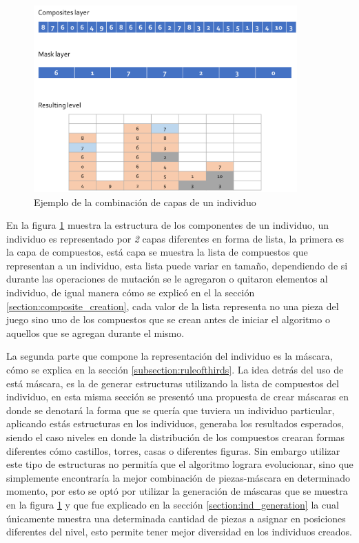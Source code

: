\begin{figure}
  \centering
  \includegraphics[width=0.9\textwidth]{img/layer12_combine.png}
  \caption{Ejemplo de la combinación de capas de un individuo}
  \label{figure:individual_representation}
\end{figure}

En la figura \ref{figure:individual_representation} muestra la estructura de los
componentes de un individuo, un individuo es representado por \textit{2} capas
diferentes en forma de lista, la primera es la capa de compuestos, está capa se
muestra la lista de compuestos que representan a un individuo, esta lista puede
variar en tamaño, dependiendo de si durante las operaciones de mutación se le
agregaron o quitaron elementos al individuo, de igual manera cómo se explicó en
el la sección \ref{section:composite_creation}, cada valor de la lista representa
no una pieza del juego sino uno de los compuestos que se crean antes de iniciar
el algoritmo o aquellos que se agregan durante el mismo.

La segunda parte que compone la representación del individuo es la máscara, cómo
se explica en la sección \ref{subsection:ruleofthirds}. La idea detrás del uso de
está máscara, es la de generar estructuras utilizando la lista de compuestos del
individuo, en esta misma sección se presentó una propuesta de crear máscaras en
donde se denotará la forma que se quería que tuviera un individuo particular,
aplicando estás estructuras en los individuos, generaba los resultados esperados,
siendo el caso niveles en donde la distribución de los compuestos crearan formas
diferentes cómo castillos, torres, casas o diferentes figuras. Sin embargo
utilizar este tipo de estructuras no permitía que el algoritmo lograra
evolucionar, sino que simplemente encontraría la mejor combinación de
piezas-máscara en determinado momento, por esto se optó por utilizar la
generación de máscaras que se muestra en la figura
\ref{figure:individual_representation} y que fue explicado en la sección
\ref{section:ind_generation} la cual únicamente muestra una determinada cantidad
de piezas a asignar en posiciones diferentes del nivel, esto permite tener mejor
diversidad en los individuos creados.

